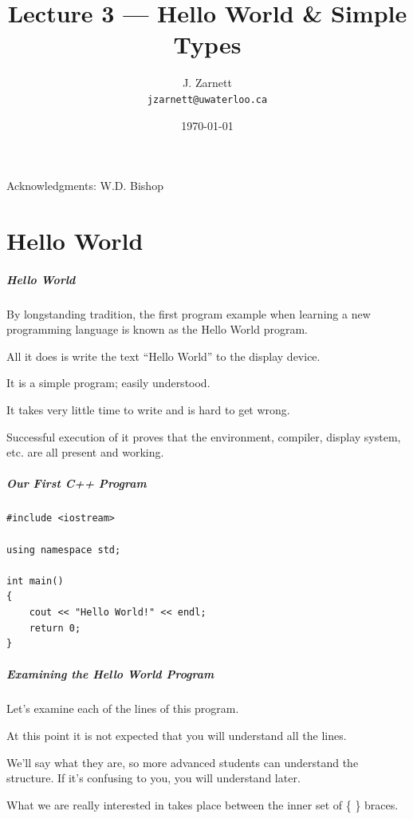 

\title{Lecture 3 --- Hello World \& Simple Types }

\author{J. Zarnett\\
\texttt{jzarnett@uwaterloo.ca}}
\date{\today}



\begin{frame}
  \titlepage
  
  \begin{center}
  \small{Acknowledgments: W.D. Bishop}
  \end{center}
 \end{frame}
 

\part{Hello World}
\begin{frame}\partpage\end{frame}

\begin{frame}
\frametitle{Hello World}

By longstanding tradition, the first program example when learning a new programming language is known as the \alert{Hello World} program.

All it does is write the text ``Hello World'' to the display device.

It is a simple program; easily understood.

It takes very little time to write and is hard to get wrong.

Successful execution of it proves that the environment, compiler, display system, etc. are all present and working.

\end{frame}

\begin{frame}[fragile]
\frametitle{Our First C++ Program}

\begin{verbatim}
#include <iostream>

using namespace std;

int main()
{
    cout << "Hello World!" << endl;
    return 0;
}
\end{verbatim}

\end{frame}

\begin{frame}
\frametitle{Examining the Hello World Program}
Let's examine each of the lines of this program.

At this point it is not expected that you will understand all the lines.

We'll say what they are, so more advanced students can understand the structure. If it's confusing to you, you will understand later.

What we are really interested in takes place between the inner set of \{ \} braces.

\end{frame}


